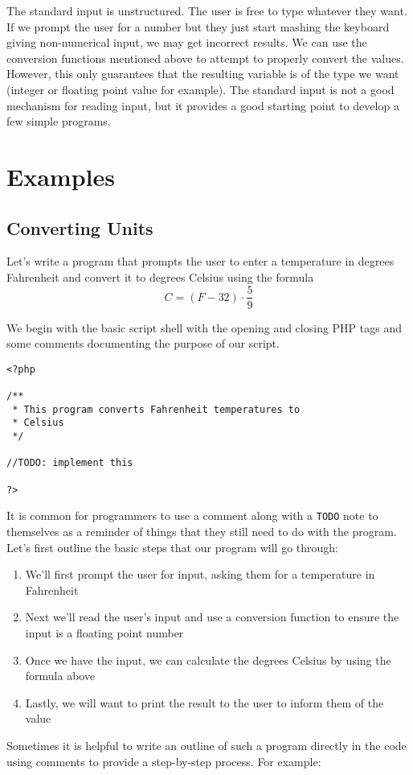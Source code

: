 The standard input is unstructured.  The user is free to type whatever they want.
If we prompt the user for a number but they just start mashing the keyboard giving 
non-numerical input, we may get incorrect results.  We can use the 
conversion functions mentioned above to attempt to properly convert the values.
However, this only guarantees that the resulting variable is of the type we want
(integer or floating point value for example).  The standard input is not a good mechanism 
for reading input, but it provides a good starting point to develop a few
simple programs.

\section{Examples}

\subsection{Converting Units}

Let's write a program that prompts 
the user to enter a temperature in degrees Fahrenheit and convert it 
to degrees Celsius using the formula
  $$C = (F - 32) \cdot \frac{5}{9}$$

We begin with the basic script shell with the opening and closing
PHP tags and some comments documenting the purpose of our
script.

\begin{verbatim}
<?php

/**
 * This program converts Fahrenheit temperatures to 
 * Celsius
 */

//TODO: implement this

?>
\end{verbatim}

It is common for programmers to use a comment along with a 
\texttt{TODO} note to themselves as a reminder of things 
that they still need to do with the program.  Let's first outline 
the basic steps that our program will go through:
\begin{enumerate}
  \item We'll first prompt the user for input, asking them for a temperature in Fahrenheit
  \item Next we'll read the user's input and use a conversion function 
    to ensure the input is a floating point number
  \item Once we have the input, we can calculate the degrees Celsius by using the formula above
  \item Lastly, we will want to print the result to the user to inform them of the value
\end{enumerate}
Sometimes it is helpful to write an outline of such a program directly in the code using
comments to provide a step-by-step process.  For example:

